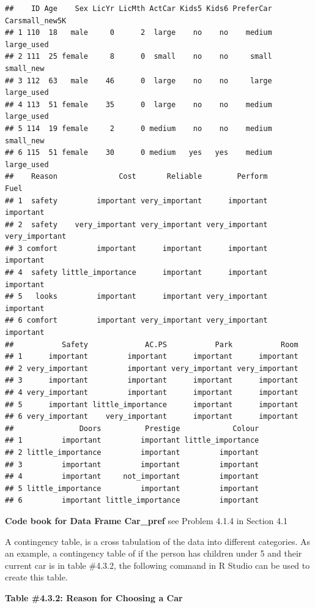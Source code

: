 \documentclass[]{book}
\begin{document}
\begin{verbatim}
##    ID Age    Sex LicYr LicMth ActCar Kids5 Kids6 PreferCar Carsmall_new5K
## 1 110  18   male     0      2  large    no    no    medium     large_used
## 2 111  25 female     8      0  small    no    no     small      small_new
## 3 112  63   male    46      0  large    no    no     large     large_used
## 4 113  51 female    35      0  large    no    no    medium     large_used
## 5 114  19 female     2      0 medium    no    no    medium      small_new
## 6 115  51 female    30      0 medium   yes   yes    medium     large_used
##    Reason              Cost       Reliable        Perform           Fuel
## 1  safety         important very_important      important      important
## 2  safety    very_important very_important very_important very_important
## 3 comfort         important      important      important      important
## 4  safety little_importance      important      important      important
## 5   looks         important      important very_important      important
## 6 comfort         important very_important very_important      important
##           Safety             AC.PS           Park           Room
## 1      important         important      important      important
## 2 very_important         important very_important very_important
## 3      important         important      important      important
## 4 very_important         important      important      important
## 5      important little_importance      important      important
## 6 very_important    very_important      important      important
##               Doors          Prestige            Colour
## 1         important         important little_importance
## 2 little_importance         important         important
## 3         important         important         important
## 4         important     not_important         important
## 5 little_importance         important         important
## 6         important little_importance         important
\end{verbatim}

\textbf{Code book for Data Frame Car\_pref} see Problem 4.1.4 in Section 4.1

A contingency table, is a cross tabulation of the data into different categories. As an example, a contingency table of if the person has children under 5 and their current car is in table \#4.3.2, the following command in R Studio can be used to create this table.

\textbf{Table \#4.3.2: Reason for Choosing a Car}
\end{document}

